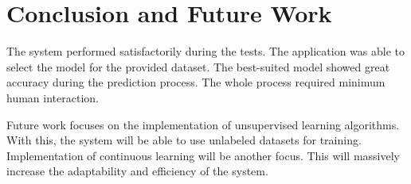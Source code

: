 \section{Conclusion and Future Work}\label{sec:conclusion_and_futur_work}

The system performed satisfactorily during the tests. The application was able to select the model for the provided dataset. The best-suited model showed great accuracy during the prediction process. The whole process required minimum human interaction.

Future work focuses on the implementation of unsupervised learning algorithms. With this, the system will be able to use unlabeled datasets for training. Implementation of continuous learning will be another focus. This will massively increase the adaptability and efficiency of the system.
